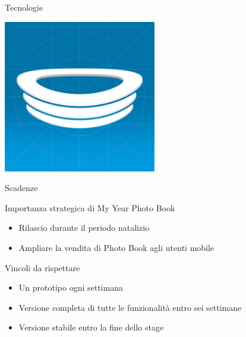 \begin{frame}{Tecnologie}
\begin{minipage}{\textwidth}
\begin{minipage}{0.49\textwidth}
\begin{minipage}{0.48\textwidth}
\begin{flushright}
						\end{flushright}
					\end{minipage}
					\begin{minipage}{0.48\textwidth}
						\includegraphics[width=0.5\textwidth]{capitolo_2/immagini/hockeyapp.png}
					\end{minipage}
				\end{minipage}
			\end{minipage}
		\end{frame}
		\begin{frame}{Scadenze}
			\begin{block}{Importanza strategica di My Year Photo Book}
				\begin{itemize}
					\item Rilascio durante il periodo natalizio
					\item Ampliare la vendita di Photo Book agli utenti mobile
				\end{itemize}
			\end{block}
			\begin{block}{Vincoli da rispettare}
				\begin{itemize}
					\item Un prototipo ogni settimana
					\item Versione completa di tutte le funzionalità entro sei settimane
					\item Versione stabile entro la fine dello stage
				\end{itemize}
			\end{block}
		\end{frame}
